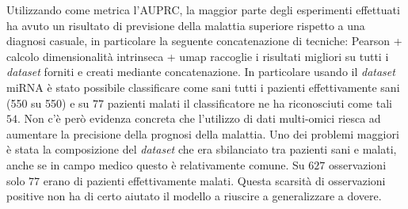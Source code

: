 \documentclass[12pt]{article}
\begin{document}
	Utilizzando come metrica l'AUPRC, la maggior parte degli esperimenti effettuati ha avuto un risultato di previsione della malattia superiore rispetto a una diagnosi casuale, in particolare la seguente concatenazione di tecniche: Pearson + calcolo dimensionalità intrinseca + umap raccoglie i risultati migliori su tutti i \textit{dataset} forniti e creati mediante concatenazione. In particolare usando il \textit{dataset} miRNA è stato possibile classificare come sani tutti i pazienti effettivamente sani (550 su 550) e su $77$ pazienti malati il classificatore ne ha riconosciuti come tali $54$.
	Non c'è però evidenza concreta che l'utilizzo di dati multi-omici riesca ad aumentare la precisione della prognosi della malattia. Uno dei problemi maggiori è stata la composizione del \textit{dataset} che era sbilanciato tra pazienti sani e malati, anche se in campo medico questo è relativamente comune. Su $627$ osservazioni solo $77$ erano di pazienti effettivamente malati. Questa scarsità di osservazioni positive non ha di certo aiutato il modello a riuscire a generalizzare a dovere.
	
	
	
	
	
	
\end{document}
